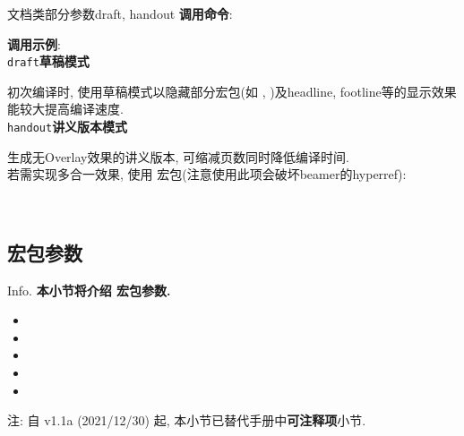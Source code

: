 \begin{frame}{文档类部分参数}{draft, handout}
	\textbf{调用命令}: 

  \textbf{调用示例}: \\

  \alert{\texttt{draft}}\hfill \textbf{草稿模式}

	初次编译时, 使用草稿模式以隐藏部分宏包(如 , )及headline, footline等的显示效果能较大提高编译速度.\\

	\alert{\texttt{handout}}\hfill \textbf{讲义版本模式}

	生成无Overlay效果的讲义版本, 可缩减页数同时降低编译时间.\\
	若需实现多合一效果, 使用  宏包(注意使用此项会破坏beamer的hyperref):
	\begin{center}
		\begin{minipage}{.8\textwidth}
			\raggedright
			\\
		\end{minipage}
	\end{center}
\end{frame}

\subsection{ 宏包参数}
\begin{frame}{Info.}
	\textbf{本小节将介绍  宏包参数.}
	\begin{multicols}{2}
		\begin{itemize}
			\item {}
			\item {}
			\item {}
			\item {}
			\item {}
		\end{itemize}
	\end{multicols}
	注: 自 \textcolor{scugreen}{v1.1a (2021/12/30)} 起, 本小节已替代手册中\alert{\textbf{可注释项}}小节.\par
	\mycopyright
\end{frame}

